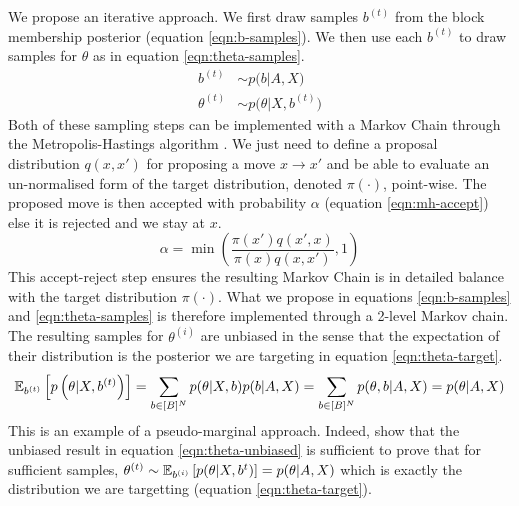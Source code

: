 We propose an iterative approach. We first draw samples $b^{(t)}$ from the block membership posterior (equation \ref{eqn:b-samples}). We then use each $b^{(t)}$ to draw samples for $\theta$ as in equation \ref{eqn:theta-samples}. 
%
\begin{align}
	b^{(t)} &\sim p \Big( b | A, X \Big)  \label{eqn:b-samples}\\
	\theta^{(t)} &\sim p\Big(\theta | X, b^{(t)} \Big) \label{eqn:theta-samples}
\end{align}
%
Both of these sampling steps can be implemented with a Markov Chain through the Metropolis-Hastings algorithm \cite{hastings-alg}. We just need to define a proposal distribution $q(x, x')$ for proposing a move $x \rightarrow x'$ and be able to evaluate an un-normalised form of the target distribution, denoted $\pi(\cdot)$, point-wise. The proposed move is then accepted with probability $\alpha$ (equation \ref{eqn:mh-accept}) else it is rejected and we stay at $x$.
%
\begin{equation}
	\alpha = \min \left( \frac{\pi(x') q(x', x)}{\pi(x) q(x, x')} , 1 \right)
	\label{eqn:mh-accept}
\end{equation}
%
This accept-reject step ensures the resulting Markov Chain is in detailed balance with the target distribution $\pi(\cdot)$. What we propose in equations \ref{eqn:b-samples} and \ref{eqn:theta-samples} is therefore implemented through a 2-level Markov chain. The resulting samples for $\theta^{(i)}$ are unbiased in the sense that the expectation of their distribution is the posterior we are targeting in equation \ref{eqn:theta-target}.
%
\begin{equation}
\mathbb{E}_{b^{(t)}} \left[p \left( \theta | X, b^{(t)} \right) \right] = \sum_{b \in [B]^N} p(\theta | X, b) p(b | A, X) = \sum_{b \in [B]^N} p(\theta, b | A, X) = p(\theta | A, X)
\label{eqn:theta-unbiased}
\end{equation}
%
This is an example of a pseudo-marginal approach. Indeed, \citet{pseudo-marginal} show that the unbiased result in equation \ref{eqn:theta-unbiased} is sufficient to prove that for sufficient samples, $\theta^{(t)} \sim \mathbb{E}_{b^{(i)}} \left[ p(\theta | X, b^{t})\right] = p(\theta 
| A, X)$ which is exactly the distribution we are targetting (equation \ref{eqn:theta-target}).
%
